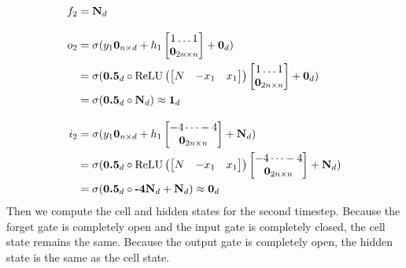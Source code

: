 \begin{align*}
  f_2 &= \textbf{N}_d \\[2ex]
  o_2 &= \sigma(y_1\textbf{0}_{n\times d} + h_{1}\begin{bmatrix} 1 \dots 1 \\ \textbf{0}_{2n\times n} \end{bmatrix}  + \textbf{0}_d) \\
  &= \sigma(\textbf{0.5}_d\circ \operatorname{ReLU}\left( \begin{bmatrix} N & -x_1 & x_1 \end{bmatrix}\right)\begin{bmatrix} 1 \dots 1 \\ \textbf{0}_{2n\times n} \end{bmatrix}  + \textbf{0}_d)  \\
  &=  \sigma(\textbf{0.5}_d\circ \textbf{N}_d) \approx \textbf{1}_d \\[2ex]
  i_2 &= \sigma(y_1\textbf{0}_{n\times d} + h_{1}\begin{bmatrix} -4 \dots -4 \\ \textbf{0}_{2n\times n} \end{bmatrix}  + \textbf{N}_d)  \\
  &= \sigma(\textbf{0.5}_d\circ \operatorname{ReLU}\left( \begin{bmatrix} N & -x_1 & x_1 \end{bmatrix}\right)\begin{bmatrix} -4 \dots -4 \\ \textbf{0}_{2n\times n} \end{bmatrix}  + \textbf{N}_d)   \\
  &=  \sigma(\textbf{0.5}_d\circ\textbf{-4N}_d + \textbf{N}_d) \approx \textbf{0}_d
\end{align*}
%
Then we compute the cell and hidden states for the second timestep. Because the forget gate is completely open and the input gate is completely closed, the cell state remains the same. Because the output gate is completely open, the hidden state is the same as the cell state.
%
